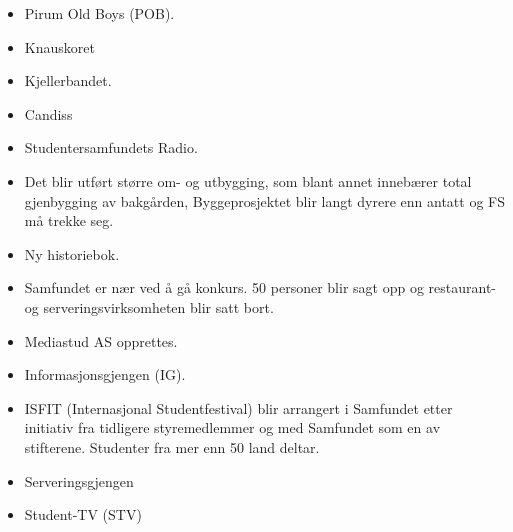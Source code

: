 
\begin{itemize}
  \item Pirum Old Boys (POB).
  \item Knauskoret
  \item Kjellerbandet.
\end{itemize}


\begin{itemize}
  \item Candiss
\end{itemize}


\begin{itemize}
  \item Studentersamfundets Radio.
\end{itemize}


\begin{itemize}
  \item Det blir utført større om- og utbygging, som blant annet innebærer total gjenbygging av bakgården,
Byggeprosjektet blir langt dyrere enn antatt og FS må trekke seg.
  \item Ny historiebok.
\end{itemize}


\begin{itemize}
  \item Samfundet er nær ved å gå konkurs. 50 personer blir sagt opp og restaurant- og serveringsvirksomheten blir satt
bort.
  \item Mediastud AS opprettes.
  \item Informasjonsgjengen (IG). 
\end{itemize}


\begin{itemize}
  \item ISFIT (Internasjonal Studentfestival) blir arrangert i Samfundet etter initiativ fra tidligere styremedlemmer og
med Samfundet som en av stifterene. Studenter fra mer enn 50 land deltar.
\end{itemize}


\begin{itemize}
  \item Serveringsgjengen
  \item Student-TV (STV)
\end{itemize}

